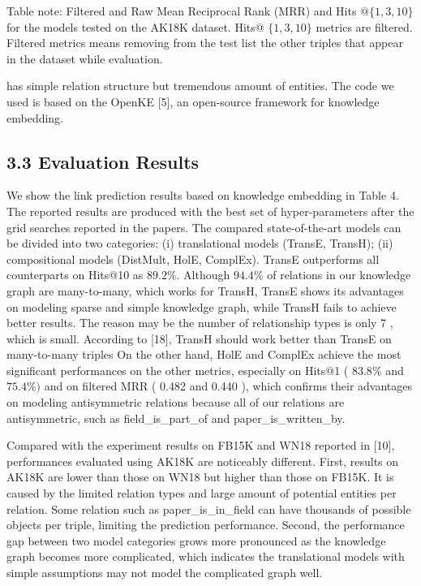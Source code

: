 \documentclass[10pt]{article}
\begin{document}
Table note: Filtered and Raw Mean Reciprocal Rank (MRR) and Hits $@\{1,3,10\}$ for the models tested on the AK18K dataset. Hits@ $\{1,3,10\}$ metrics are filtered. Filtered metrics means removing from the test list the other triples that appear in the dataset while evaluation.

has simple relation structure but tremendous amount of entities. The code we used is based on the OpenKE [5], an open-source framework for knowledge embedding.

\subsection*{3.3 Evaluation Results}
We show the link prediction results based on knowledge embedding in Table 4. The reported results are produced with the best set of hyper-parameters after the grid searches reported in the papers. The compared state-of-the-art models can be divided into two categories: (i) translational models (TransE, TransH); (ii) compositional models (DistMult, HolE, ComplEx). TransE outperforms all counterparts on Hits@10 as $89.2 \%$. Although $94.4 \%$ of relations in our knowledge graph are many-to-many, which works for TransH, TransE shows its advantages on modeling sparse and simple knowledge graph, while TransH fails to achieve better results. The reason may be the number of relationship types is only 7 , which is small. According to [18], TransH should work better than TransE on many-to-many triples On the other hand, HolE and ComplEx achieve the most significant performances on the other metrics, especially on Hits@1 ( $83.8 \%$ and $75.4 \%)$ and on filtered MRR ( 0.482 and 0.440 ), which confirms their advantages on modeling antisymmetric relations because all of our relations are antisymmetric, such as field\_is\_part\_of and paper\_is\_written\_by.

Compared with the experiment results on FB15K and WN18 reported in [10], performances evaluated using AK18K are noticeably different. First, results on AK18K are lower than those on WN18 but higher than those on FB15K. It is caused by the limited relation types and large amount of potential entities per relation. Some relation such as paper\_is\_in\_field can have thousands of possible objects per triple, limiting the prediction performance. Second, the performance gap between two model categories grows more pronounced as the knowledge graph becomes more complicated, which indicates the translational models with simple assumptions may not model the complicated graph well.
\end{document}
